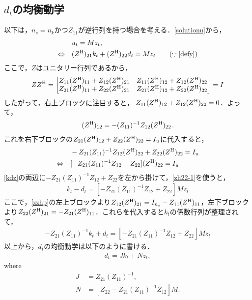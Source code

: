 \documentclass[a4j, dvipdfmx]{jarticle}
\begin{document}
\subsection{$d_t$の均衡動学}
以下は，$n_s = n_k$かつ$Z_{11}$が逆行列を持つ場合を考える．\eqref{solutionu}から，
\begin{align}
&u_t = Mz_t,\notag \\
\Leftrightarrow \quad & (Z^{\rm{H}})_{21}k_t + (Z^{\rm{H}})_{22}d_t = M z_t \qquad (\because \eqref{defy}) \label{kdz}
\end{align}
ここで，$Z$はユニタリー行列であるから，
\begin{align*}ZZ^{\rm{H}} = \begin{bmatrix}Z_{11}(Z^{\rm{H}})_{11} + Z_{12}(Z^{\rm{H}})_{21} & Z_{11}(Z^{\rm{H}})_{12} + Z_{12}(Z^{\rm{H}})_{22}\\
Z_{21}(Z^{\rm{H}})_{11} + Z_{22}(Z^{\rm{H}})_{21}& Z_{21}(Z^{\rm{H}})_{12} + Z_{22}(Z^{\rm{H}})_{22}\end{bmatrix} = I\label{zzhp}
\end{align*}
したがって，右上ブロックに注目すると，
$Z_{11}(Z^{\rm{H}})_{12} + Z_{12}(Z^{\rm{H}})_{22}=0$．よって，
\begin{align}
(Z^{\rm{H}})_{12} = -(Z_{11})^{-1}Z_{12}(Z^{\rm{H}})_{22}.
\end{align}
これを右下ブロックの$Z_{21}(Z^{\rm{H}})_{12} + Z_{22}(Z^{\rm{H}})_{22} = I_u$に代入すると，
\begin{align}
&-Z_{21}(Z_{11})^{-1}Z_{12}(Z^{\rm{H}})_{22} + Z_{22}(Z^{\rm{H}})_{22} = I_u\notag\\
\Leftrightarrow \quad & [-Z_{21}(Z_{11})^{-1}Z_{12} + Z_{22}](Z^{\rm{H}})_{22} = I_u\label{zh22-1}
\end{align}
\eqref{kdz}の両辺に$-Z_{21}(Z_{11})^{-1}Z_{12} + Z_{22}$を左から掛けて，\eqref{zh22-1}を使うと，
\begin{align}
[-Z_{21}(Z_{11})^{-1}Z_{12}(Z^{\rm{H}})_{21} + Z_{22}(Z^{\rm{H}})_{21}]k_t - d_t = [-Z_{21}(Z_{11})^{-1}Z_{12} + Z_{22}]Mz_t
\end{align}
ここで，\eqref{zzhp}の左上ブロックより$Z_{12}(Z^{\rm{H}})_{21} = I_{n_s} - Z_{11}(Z^{\rm{H}})_{11}$，左下ブロックより$Z_{22}(Z^{\rm{H}})_{21} = -Z_{21}(Z^{\rm{H}})_{11}$．これらを代入すると$k_t$の係数行列が整理されて，
\begin{align}
-Z_{21}(Z_{11})^{-1}k_t + d_t = [-Z_{21}(Z_{11})^{-1}Z_{12} + Z_{22}]Mz_t
\end{align}
以上から，$d_t$の均衡動学は以下のように書ける．
\begin{align}
d_t = J k_t + N z_t, \label{solutiond}
\end{align}
where
\begin{align}
J &= Z_{21}(Z_{11})^{-1},\label{j}\\
N &= [Z_{22} - Z_{21}(Z_{11})^{-1}Z_{12}]M. \label{n}
\end{align}
\end{document}
